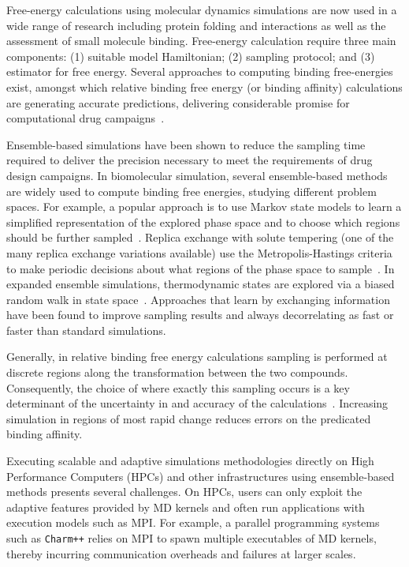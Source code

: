 Free-energy calculations using molecular dynamics simulations are now used in
a wide range of research including protein folding and interactions as well
as the assessment of small molecule binding. Free-energy calculation require
three main components: (1) suitable model Hamiltonian; (2) sampling protocol;
and (3) estimator for free energy. Several approaches to computing binding
free-energies exist, amongst which relative binding free energy (or binding
affinity) calculations are generating accurate predictions, delivering
considerable promise for computational drug campaigns~\cite{Karplus2005}.

Ensemble-based simulations have been shown to reduce the sampling time
required to deliver the precision necessary to meet the requirements of drug
design campaigns. In biomolecular simulation, several ensemble-based methods
are widely used to compute binding free energies, studying different problem
spaces. For example, a popular approach is to use Markov state models to
learn a simplified representation of the explored phase space and to choose
which regions should be further sampled~\cite{Bowman2010}. Replica exchange
with solute tempering (one of the many replica exchange variations available)
use the Metropolis-Hastings criteria to make periodic decisions about what
regions of the phase space to sample~\cite{Earl2005,Hritz2008,Kim2012}. In
expanded ensemble simulations, thermodynamic states are explored via a biased
random walk in state space~\cite{Lyubartsev1992}. Approaches that learn by
exchanging information have been found to improve sampling results and always
decorrelating as fast or faster than standard simulations.

Generally, in relative binding free energy calculations sampling is performed
at discrete regions along the transformation between the two compounds.
Consequently, the choice of where exactly this sampling occurs is a key
determinant of the uncertainty in and accuracy of the
calculations~\cite{Ruiter2013}. Increasing simulation in regions of most
rapid change reduces errors on the predicated binding affinity.

Executing scalable and adaptive simulations methodologies directly on High
Performance Computers (HPCs) and other infrastructures using ensemble-based
methods presents several challenges. On HPCs, users can only exploit the
adaptive features provided by MD kernels and often run applications with
execution models such as MPI. For example, a parallel programming systems
such as \texttt{Charm++} relies on MPI to spawn multiple executables of MD
kernels, thereby incurring communication overheads and failures at larger
scales.


